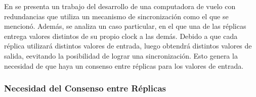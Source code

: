En \cite{wensley1978sift} se presenta un trabajo del desarrollo de una computadora de vuelo con redundancias que utiliza un mecanismo de sincronización como el que se mencionó. Además, se analiza un caso particular, en el que una de las réplicas entrega valores distintos de su propio clock a las demás. Debido a que cada réplica utilizará distintos valores de entrada, luego obtendrá distintos valores de salida, eevitando la posibilidad de lograr una sincronización. Esto genera la necesidad de que haya un consenso entre réplicas para los valores de entrada.


\subsubsection{Necesidad del Consenso entre Réplicas}\label{sec:consenso}


